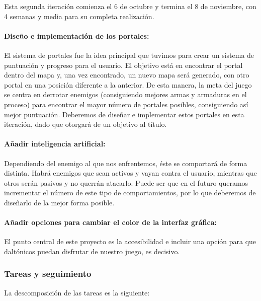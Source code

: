 Esta segunda iteración comienza el 6 de octubre y termina el 8 de noviembre, con 4 semanas y media para su completa realización.

\paragraph{Diseño e implementación de los portales:} El sistema de portales fue la idea principal que tuvimos para crear un sistema de puntuación y progreso para el usuario. El objetivo está en encontrar el portal dentro del mapa y, una vez encontrado, un nuevo mapa será generado, con otro portal en una posición diferente a la anterior. De esta manera, la meta del juego se centra en derrotar enemigos (consiguiendo mejores armas y armaduras en el proceso) para encontrar el mayor número de portales posibles, consiguiendo así mejor puntuación.
Deberemos de diseñar e implementar estos portales en esta iteración, dado que otorgará de un objetivo al título.

\paragraph{Añadir inteligencia artificial:} Dependiendo del enemigo al que nos enfrentemos, éste se comportará de forma distinta. Habrá enemigos que sean activos y vayan contra el usuario, mientras que otros serán pasivos y no querrán atacarlo. Puede ser que en el futuro queramos incrementar el número de este tipo de comportamientos, por lo que deberemos de diseñarlo de la mejor forma posible.

\paragraph{Añadir opciones para cambiar el color de la interfaz gráfica:} El punto central de este proyecto es la accesibilidad e incluir una opción para que daltónicos puedan disfrutar de nuestro juego, es decisivo.

\subsubsection{Tareas y seguimiento}

La descomposición de las tareas es la siguiente:

